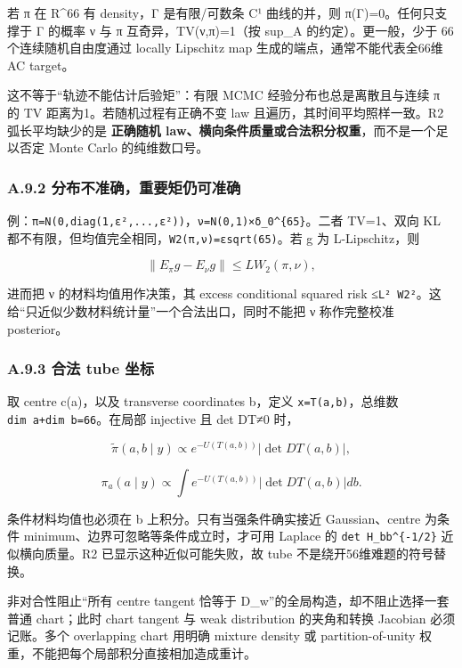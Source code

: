 \documentclass[
  11pt,
  a4paper,
]{article}
\begin{document}
若 π 在 R\^{}66 有 density，Γ 是有限/可数条 C¹ 曲线的并，则
π(Γ)=0。任何只支撑于 Γ 的概率 ν 与 π 互奇异，TV(ν,π)=1（按 sup\_\allowbreak{}A
的约定）。更一般，少于 66 个连续随机自由度通过 locally Lipschitz map
生成的端点，通常不能代表全66维 AC target。

这不等于``轨迹不能估计后验矩''：有限 MCMC 经验分布也总是离散且与连续 π
的 TV 距离为1。若随机过程有正确不变 law 且遍历，其时间平均照样一致。R2
弧长平均缺少的是 \textbf{正确随机
law、横向条件质量或合法积分权重}，而不是一个足以否定 Monte Carlo
的纯维数口号。

\hypertarget{a.9.2-ux5206ux5e03ux4e0dux51c6ux786eux91cdux8981ux77e9ux4ecdux53efux51c6ux786e}{%
\subsubsection{A.9.2
分布不准确，重要矩仍可准确}\label{a.9.2-ux5206ux5e03ux4e0dux51c6ux786eux91cdux8981ux77e9ux4ecdux53efux51c6ux786e}}

例：\texttt{π=N(0,diag(1,ε²,...,ε²))}，\texttt{ν=N(0,1)×δ\_\allowbreak{}0\^{}\{65\}}。二者
TV=1、双向 KL 都不有限，但均值完全相同，\texttt{W2(π,ν)=εsqrt(65)}。若 g
为 L-Lipschitz，则

\[
\|E_\pi g-E_\nu g\|\le L W_2(\pi,\nu),
\]

进而把 ν 的材料均值用作决策，其 excess conditional squared risk
≤\texttt{L²\ W2²}。这给``只近似少数材料统计量''一个合法出口，同时不能把
ν 称作完整校准 posterior。

\hypertarget{a.9.3-ux5408ux6cd5-tube-ux5750ux6807}{%
\subsubsection{A.9.3 合法 tube
坐标}\label{a.9.3-ux5408ux6cd5-tube-ux5750ux6807}}

取 centre c(a)，以及 transverse coordinates b，定义
\texttt{x=T(a,b)}，总维数 \texttt{dim\ a+dim\ b=66}。在局部 injective 且
det DT≠0 时，

\[
\tilde\pi(a,b\mid y)\propto e^{-U(T(a,b))}|\det DT(a,b)|,
\]

\[
\pi_a(a\mid y)\propto \int e^{-U(T(a,b))}|\det DT(a,b)|db.
\]

条件材料均值也必须在 b 上积分。只有当强条件确实接近 Gaussian、centre
为条件 minimum、边界可忽略等条件成立时，才可用 Laplace 的
\texttt{det\ H\_\allowbreak{}bb\^{}\{-1/2\}} 近似横向质量。R2
已显示这种近似可能失败，故 tube 不是绕开56维难题的符号替换。

非对合性阻止``所有 centre tangent 恰等于
D\_\allowbreak{}w''的全局构造，却不阻止选择一套普通 chart；此时 chart tangent 与 weak
distribution 的夹角和转换 Jacobian 必须记账。多个 overlapping chart
用明确 mixture density 或 partition-of-unity
权重，不能把每个局部积分直接相加造成重计。
\end{document}
